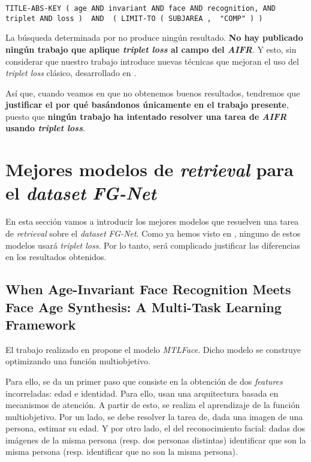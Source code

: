 \begin{lstlisting}[caption=Keywords usandos para la búsqueda de trabajos que combinen \textit{AIFR} y \textit{triplet loss} en \textit{SCOPUS}, label=code:scopus_search_especifico]
    TITLE-ABS-KEY ( age AND invariant AND face AND recognition, AND triplet AND loss )  AND  ( LIMIT-TO ( SUBJAREA ,  "COMP" ) )
\end{lstlisting}

La búsqueda determinada por  no produce ningún resultado. \textbf{No hay publicado ningún trabajo que aplique \textit{triplet loss} al campo del \textit{AIFR}}. Y esto, sin considerar que nuestro trabajo introduce nuevas técnicas que mejoran el uso del \textit{triplet loss} clásico, desarrollado en .

Así que, cuando veamos en  que no obtenemos buenos resultados, tendremos que \textbf{justificar el por qué basándonos únicamente en el trabajo presente}, puesto que \textbf{ningún trabajo ha intentado resolver una tarea de \textit{AIFR} usando \textit{triplet loss}}.

\section{Mejores modelos de \textit{retrieval} para el \textit{dataset} \textit{FG-Net}}

En esta sección vamos a introducir los mejores modelos que resuelven una tarea de \textit{retrieval} sobre el \textit{dataset} \textit{FG-Net}. Como ya hemos visto en , ninguno de estos modelos usará \textit{triplet loss}. Por lo tanto, será complicado justificar las diferencias en los resultados obtenidos.

\subsection{When Age-Invariant Face Recognition Meets Face Age Synthesis: A Multi-Task Learning Framework} \label{isubs:mtl_face}

El trabajo realizado en \cite{informatica:best_fgnet_model} propone el modelo \textit{MTLFace}. Dicho modelo se construye optimizando una función multiobjetivo.

Para ello, se da un primer paso que consiste en la obtención de dos \textit{features} incorreladas: edad e identidad. Para ello, usan una arquitectura basada en mecanismos de atención. A partir de esto, se realiza el aprendizaje de la función multiobjetivo. Por un lado, se debe resolver la tarea de, dada una imagen de una persona, estimar su edad. Y por otro lado, el del reconocimiento facial: dadas dos imágenes de la misma persona (resp. dos personas distintas) identificar que son la misma persona (resp. identificar que no son la misma persona).

